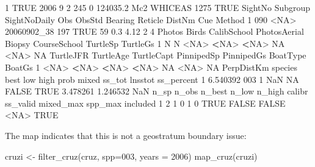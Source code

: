 \documentclass[
]{book}
\newenvironment{Shaded}{\begin{snugshade}}{\end{snugshade}}
\newcommand{\AttributeTok}[1]{\textcolor[rgb]{0.77,0.63,0.00}{#1}}
\newcommand{\ConstantTok}[1]{\textcolor[rgb]{0.00,0.00,0.00}{#1}}
\newcommand{\DecValTok}[1]{\textcolor[rgb]{0.00,0.00,0.81}{#1}}
\newcommand{\ErrorTok}[1]{\textcolor[rgb]{0.64,0.00,0.00}{\textbf{#1}}}
\newcommand{\FloatTok}[1]{\textcolor[rgb]{0.00,0.00,0.81}{#1}}
\newcommand{\FunctionTok}[1]{\textcolor[rgb]{0.00,0.00,0.00}{#1}}
\newcommand{\NormalTok}[1]{#1}
\newcommand{\OtherTok}[1]{\textcolor[rgb]{0.56,0.35,0.01}{#1}}
\newcommand{\SpecialCharTok}[1]{\textcolor[rgb]{0.00,0.00,0.00}{#1}}
\newcommand{\StringTok}[1]{\textcolor[rgb]{0.31,0.60,0.02}{#1}}
\begin{document}
\begin{Shaded}
\begin{Highlighting}[]
\DecValTok{1}            \ConstantTok{TRUE} \DecValTok{2006}     \DecValTok{9}   \DecValTok{2}  \DecValTok{245}      \DecValTok{0} \FloatTok{124035.2}\NormalTok{  Mc2 WHICEAS   }\DecValTok{1275} \ConstantTok{TRUE}
\NormalTok{  SightNo Subgroup SightNoDaily Obs ObsStd Bearing Reticle DistNm Cue Method}
\DecValTok{1}     \DecValTok{090}     \SpecialCharTok{\textless{}}\ConstantTok{NA}\SpecialCharTok{\textgreater{}}\NormalTok{  20060902\_38 }\DecValTok{197}   \ConstantTok{TRUE}      \DecValTok{59}     \FloatTok{0.3}   \FloatTok{4.12}   \DecValTok{2}      \DecValTok{4}
\NormalTok{  Photos Birds CalibSchool PhotosAerial Biopsy CourseSchool TurtleSp TurtleGs}
\DecValTok{1}\NormalTok{      N     N        }\SpecialCharTok{\textless{}}\ConstantTok{NA}\SpecialCharTok{\textgreater{}}         \ErrorTok{\textless{}}\ConstantTok{NA}\SpecialCharTok{\textgreater{}}   \ErrorTok{\textless{}}\ConstantTok{NA}\SpecialCharTok{\textgreater{}}           \ConstantTok{NA}     \SpecialCharTok{\textless{}}\ConstantTok{NA}\SpecialCharTok{\textgreater{}}       \ConstantTok{NA}
\NormalTok{  TurtleJFR TurtleAge TurtleCapt PinnipedSp PinnipedGs BoatType BoatGs}
\DecValTok{1}      \SpecialCharTok{\textless{}}\ConstantTok{NA}\SpecialCharTok{\textgreater{}}      \ErrorTok{\textless{}}\ConstantTok{NA}\SpecialCharTok{\textgreater{}}       \ErrorTok{\textless{}}\ConstantTok{NA}\SpecialCharTok{\textgreater{}}       \ErrorTok{\textless{}}\ConstantTok{NA}\SpecialCharTok{\textgreater{}}         \ConstantTok{NA}     \SpecialCharTok{\textless{}}\ConstantTok{NA}\SpecialCharTok{\textgreater{}}     \ConstantTok{NA}
\NormalTok{  PerpDistKm species best low high  prob mixed   ss\_tot  lnsstot ss\_percent}
\DecValTok{1}   \FloatTok{6.540392}     \DecValTok{003}    \DecValTok{1} \ConstantTok{NaN}   \ConstantTok{NA} \ConstantTok{FALSE}  \ConstantTok{TRUE} \FloatTok{3.478261} \FloatTok{1.246532}        \ConstantTok{NaN}
\NormalTok{  n\_sp n\_obs n\_best n\_low n\_high calibr ss\_valid mixed\_max spp\_max included}
\DecValTok{1}    \DecValTok{2}     \DecValTok{1}      \DecValTok{0}     \DecValTok{1}      \DecValTok{0}   \ConstantTok{TRUE}    \ConstantTok{FALSE}     \ConstantTok{FALSE}    \SpecialCharTok{\textless{}}\ConstantTok{NA}\SpecialCharTok{\textgreater{}}     \ConstantTok{TRUE}
\end{Highlighting}
\end{Shaded}

The map indicates that this is not a geostratum boundary issue:

\begin{Shaded}
\begin{Highlighting}[]
\NormalTok{cruzi }\OtherTok{\textless{}{-}} \FunctionTok{filter\_cruz}\NormalTok{(cruz, }\AttributeTok{spp=}\StringTok{\textquotesingle{}003\textquotesingle{}}\NormalTok{, }\AttributeTok{years =} \DecValTok{2006}\NormalTok{)}
\FunctionTok{map\_cruz}\NormalTok{(cruzi)}
\end{Highlighting}
\end{Shaded}
\end{document}
